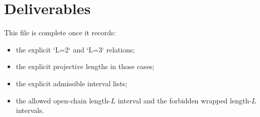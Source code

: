 \documentclass{article}
\theoremstyle{definition}
\begin{document}
\section{Deliverables}

This file is complete once it records:

\begin{itemize}
\item the explicit `L=2` and `L=3` relations;
\item the explicit projective lengths in those cases;
\item the explicit admissible interval lists;
\item the allowed open-chain length-$L$ interval and the forbidden wrapped
  length-$L$ intervals.
\end{itemize}
\end{document}
